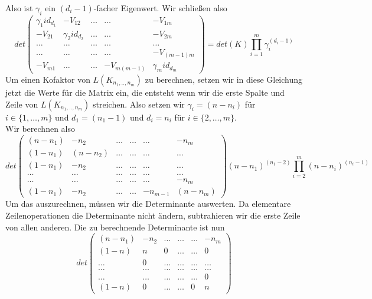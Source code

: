 Also ist $\gamma_i$ ein $(d_i-1)$-facher Eigenwert.
Wir schließen also
\begin{equation}
{det
\begin{pmatrix}
 {\gamma_1}id_{d_1}&-V_{12}&\ldots&\ldots&-V_{1m}\\
 -V_{21}&{\gamma_2}id_{d_2}&\ldots&\ldots&-V_{2m}\\
 \ldots&\ldots&\ldots&\ldots&\ldots\\
  \ldots&\ldots&\ldots&\ldots&-V_{(m-1)m}\\
 -V_{m1}&\ldots&\ldots&-V_{m(m-1)}&{\gamma_m}id_{d_m}
\end{pmatrix}
}
={det(K)\prod_{i=1}^m \gamma_i^{(d_i -1)}}
\end{equation}
Um einen Kofaktor von $L(K_{n_1,..,n_m})$ zu berechnen, setzen wir in diese Gleichung jetzt die Werte für die Matrix ein, die entsteht wenn wir die erste Spalte und Zeile von $L(K_{n_1,..,n_m})$ streichen. Also setzen wir 
$\gamma_i=(n-n_i)$ für $i\in\{1,\ldots,m\}$ und
$d_1=(n_1 -1)$ und $d_i=n_i$ für $i\in\{2,\ldots,m\}$.\\
Wir berechnen also
\begin{equation}
\label{vmp_1}
det
\begin{pmatrix}
 (n-n_1)&-n_2&\ldots&\ldots&\ldots&-n_m\\
 (1-n_1)&(n-n_2)&\ldots&\ldots&\ldots&\ldots\\
 (1-n_1)&-n_2&\ldots&\ldots&\ldots&\ldots\\
 \ldots&\ldots&\ldots&\ldots&\ldots&\ldots\\
 \ldots&\ldots&\ldots&\ldots&\ldots&-n_m\\
 (1-n_1)&-n_2&\ldots&\ldots&-n_{m-1}&(n-n_m)
\end{pmatrix}
(n-n_1)^{(n_1 -2)}\prod_{i=2}^m (n-n_i)^{(n_i -1)}
\end{equation}
Um das auszurechnen, müssen wir die Determinante auswerten. 
Da elementare Zeilenoperationen die Determinante nicht ändern, subtrahieren wir die erste Zeile von allen anderen. Die zu berechnende Determinante ist nun
\begin{equation}
det
\begin{pmatrix}
 (n-n_1)&-n_2&\ldots&\ldots&\ldots&-n_m\\
 (1-n)&n&0&\ldots&\ldots&0\\
 \ldots&0&\ldots&\ldots&\ldots&\ldots\\
 \ldots&\ldots&\ldots&\ldots&\ldots&\ldots\\
 \ldots&\ldots&\ldots&\ldots&\ldots&0\\
 (1-n)&0&\ldots&\ldots&0&n
\end{pmatrix}
\end{equation}
